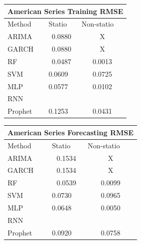 \documentclass[10pt,twocolumn,letterpaper]{article}
\begin{document}
	\begin{table}[h]\label{table:trainingRMSE}
		\centering
		\begin{tabular}{|lll|}
			\hline
			\multicolumn{3}{|c|}{American Series Training RMSE}                                                  \\ \hline
			\multicolumn{1}{|l|}{Method}  & \multicolumn{1}{l|}{Statio} & Non-statio             \\ \hline
			\multicolumn{1}{|l|}{ARIMA}   & \multicolumn{1}{c|}{0.0880}       & \multicolumn{1}{c|}{X} \\ \hline
			\multicolumn{1}{|l|}{GARCH}   & \multicolumn{1}{c|}{0.0880}       & \multicolumn{1}{c|}{X} \\ \hline
			\multicolumn{1}{|l|}{RF}      & \multicolumn{1}{c|}{0.0487}       & \multicolumn{1}{c|}{0.0013}  \\ \hline
			\multicolumn{1}{|l|}{SVM}     & \multicolumn{1}{l|}{0.0609}       & \multicolumn{1}{c|}{0.0725}  \\ \hline
			\multicolumn{1}{|l|}{MLP}     & \multicolumn{1}{l|}{0.0577}       & \multicolumn{1}{c|}{0.0102}  \\ \hline
			\multicolumn{1}{|l|}{RNN}     & \multicolumn{1}{l|}{}       & \multicolumn{1}{c|}{}  \\ \hline
			\multicolumn{1}{|l|}{Prophet} & \multicolumn{1}{l|}{0.1253}       & \multicolumn{1}{c|}{0.0431}  \\ \hline
		\end{tabular}
	\end{table}
	
	\begin{table}[h]
		\label{table:forecastRMSE}
		\centering
		\begin{tabular}{|lll|}
			\hline
			\multicolumn{3}{|c|}{American Series Forecasting RMSE}                                                  \\ \hline
			\multicolumn{1}{|l|}{Method}  & \multicolumn{1}{l|}{Statio} & Non-statio             \\ \hline
			\multicolumn{1}{|l|}{ARIMA}   & \multicolumn{1}{c|}{0.1534}       & \multicolumn{1}{c|}{X} \\ \hline
			\multicolumn{1}{|l|}{GARCH}   & \multicolumn{1}{c|}{0.1534}       & \multicolumn{1}{c|}{X} \\ \hline
			\multicolumn{1}{|l|}{RF}      & \multicolumn{1}{c|}{0.0539}       & \multicolumn{1}{c|}{0.0099}  \\ \hline
			\multicolumn{1}{|l|}{SVM}     & \multicolumn{1}{l|}{0.0730}       & \multicolumn{1}{c|}{0.0965}  \\ \hline
			\multicolumn{1}{|l|}{MLP}     & \multicolumn{1}{l|}{0.0648}       & \multicolumn{1}{c|}{0.0050}  \\ \hline
			\multicolumn{1}{|l|}{RNN}     & \multicolumn{1}{l|}{}       & \multicolumn{1}{c|}{}  \\ \hline
			\multicolumn{1}{|l|}{Prophet} & \multicolumn{1}{l|}{0.0920}       & \multicolumn{1}{c|}{0.0758}  \\ \hline
		\end{tabular}
	\end{table}
	
\end{document}
